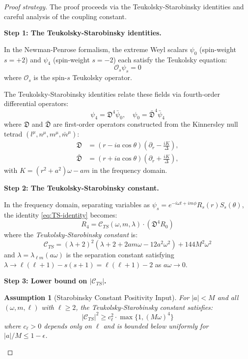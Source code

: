 \documentclass[12pt,a4paper]{article}
\newtheorem{assumption}[theorem]{Assumption}
\begin{document}
\begin{proof}[Proof strategy]
The proof proceeds via the Teukolsky-Starobinsky identities and careful analysis of the coupling constant.

\textbf{Step 1: The Teukolsky-Starobinsky identities.}

In the Newman-Penrose formalism, the extreme Weyl scalars $\psi_0$ (spin-weight $s = +2$) and $\psi_4$ (spin-weight $s = -2$) each satisfy the Teukolsky equation:
\begin{equation}
\mathcal{O}_s \psi_s = 0
\end{equation}
where $\mathcal{O}_s$ is the spin-$s$ Teukolsky operator.

The Teukolsky-Starobinsky identities relate these fields via fourth-order differential operators:
\begin{equation}\label{eq:TS-identity}
\psi_4 = \mathfrak{D}^4 \bar{\psi}_0, \quad \psi_0 = \bar{\mathfrak{D}}^4 \bar{\psi}_4
\end{equation}
where $\mathfrak{D}$ and $\bar{\mathfrak{D}}$ are first-order operators constructed from the Kinnersley null tetrad $(l^\mu, n^\mu, m^\mu, \bar{m}^\mu)$:
\begin{align}
\mathfrak{D} &= (r - ia\cos\theta)\left(\partial_r - \frac{iK}{\Delta}\right), \\
\bar{\mathfrak{D}} &= (r + ia\cos\theta)\left(\partial_r + \frac{iK}{\Delta}\right),
\end{align}
with $K = (r^2 + a^2)\omega - am$ in the frequency domain.

\textbf{Step 2: The Teukolsky-Starobinsky constant.}

In the frequency domain, separating variables as $\psi_s = e^{-i\omega t + im\phi}R_s(r)S_s(\theta)$, the identity \eqref{eq:TS-identity} becomes:
\begin{equation}
R_4 = \mathcal{C}_{TS}(\omega, m, \lambda) \cdot (\mathfrak{D}^4 R_0)
\end{equation}
where the \textit{Teukolsky-Starobinsky constant} is:
\begin{equation}\label{eq:cts-explicit}
\mathcal{C}_{TS} = (\lambda + 2)^2(\lambda + 2 + 2am\omega - 12a^2\omega^2) + 144M^2\omega^2
\end{equation}
and $\lambda = \lambda_{\ell m}(a\omega)$ is the separation constant satisfying $\lambda \to \ell(\ell+1) - s(s+1) = \ell(\ell+1) - 2$ as $a\omega \to 0$.

\textbf{Step 3: Lower bound on $|\mathcal{C}_{TS}|$.}

\begin{assumption}[Starobinsky Constant Positivity Input]\label{lem:cts-positive}
For $|a| < M$ and all $(\omega, m, \ell)$ with $\ell \geq 2$, the Teukolsky-Starobinsky constant satisfies:
\begin{equation}
|\mathcal{C}_{TS}|^2 \geq c_{\ell}^2 \cdot \max\{1, (M\omega)^4\}
\end{equation}
where $c_\ell > 0$ depends only on $\ell$ and is bounded below uniformly for $|a|/M \leq 1 - \epsilon$.
\end{assumption}


\end{proof}
\end{document}
